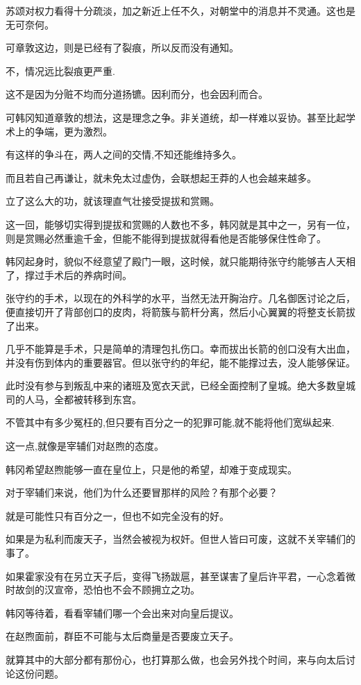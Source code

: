 苏颂对权力看得十分疏淡，加之新近上任不久，对朝堂中的消息并不灵通。这也是无可奈何。

可章敦这边，则是已经有了裂痕，所以反而没有通知。

不，情况远比裂痕更严重.

这不是因为分赃不均而分道扬镳。因利而分，也会因利而合。

可韩冈知道章敦的想法，这是理念之争。非关道统，却一样难以妥协。甚至比起学术上的争端，更为激烈。

有这样的争斗在，两人之间的交情,不知还能维持多久。

而且若自己再谦让，就未免太过虚伪，会联想起王莽的人也会越来越多。

立了这么大的功，就该理直气壮接受提拔和赏赐。

这一回，能够切实得到提拔和赏赐的人数也不多，韩冈就是其中之一，另有一位，则是赏赐必然重逾千金，但能不能得到提拔就得看他是否能够保住性命了。

韩冈起身时，貌似不经意望了殿门一眼，这时候，就只能期待张守约能够吉人天相了，撑过手术后的养病时间。

张守约的手术，以现在的外科学的水平，当然无法开胸治疗。几名御医讨论之后，便直接切开了背部创口的皮肉，将箭簇与箭杆分离，然后小心翼翼的将整支长箭拔了出来。

几乎不能算是手术，只是简单的清理包扎伤口。幸而拔出长箭的创口没有大出血，并没有伤到体内的重要器官。但以张守约的年纪，能不能撑过去，没人能够保证。

此时没有参与到叛乱中来的诸班及宽衣天武，已经全面控制了皇城。绝大多数皇城司的人马，全都被转移到东宫。

不管其中有多少冤枉的,但只要有百分之一的犯罪可能,就不能将他们宽纵起来.

这一点,就像是宰辅们对赵煦的态度。

韩冈希望赵煦能够一直在皇位上，只是他的希望，却难于变成现实。

对于宰辅们来说，他们为什么还要冒那样的风险？有那个必要？

就是可能性只有百分之一，但也不如完全没有的好。

如果是为私利而废天子，当然会被视为权奸。但世人皆曰可废，这就不关宰辅们的事了。

如果霍家没有在另立天子后，变得飞扬跋扈，甚至谋害了皇后许平君，一心念着微时故剑的汉宣帝，恐怕也不会不顾拥立之功。

韩冈等待着，看看宰辅们哪一个会出来对向皇后提议。

在赵煦面前，群臣不可能与太后商量是否要废立天子。

就算其中的大部分都有那份心，也打算那么做，也会另外找个时间，来与向太后讨论这份问题。

